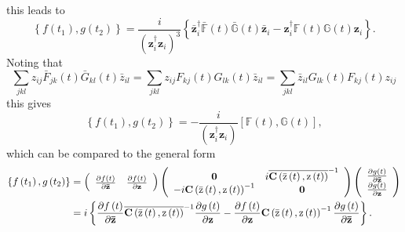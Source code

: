 \documentclass[aps,preprint]{revtex4}%
\begin{document}
this leads to
\begin{equation}
\left\{  f\left(  t_{1}\right)  ,g\left(  t_{2}\right)  \right\}  =\frac
{i}{\left(  \mathbf{z}_{i}^{\dagger}\mathbf{z}_{i}\right)  ^{3}}\left\{
\mathbf{\bar{z}}_{i}^{\dagger}\mathbb{\bar{F}}\left(  t\right)  \mathbb{\bar
{G}}\left(  t\right)  \mathbf{\bar{z}}_{i}-\mathbf{z}_{i}^{\dagger}%
\mathbb{F}\left(  t\right)  \mathbb{G}\left(  t\right)  \mathbf{z}%
_{i}\right\}  .
\end{equation}
Noting that
\begin{equation}
\sum_{jkl}z_{ij}\bar{F}_{jk}\left(  t\right)  \bar{G}_{kl}\left(  t\right)
\bar{z}_{il}=\sum_{jkl}z_{ij}F_{kj}\left(  t\right)  G_{lk}\left(  t\right)
\bar{z}_{il}=\sum_{jkl}\bar{z}_{il}G_{lk}\left(  t\right)  F_{kj}\left(
t\right)  z_{ij}%
\end{equation}
this gives
\begin{equation}
\left\{  f\left(  t_{1}\right)  ,g\left(  t_{2}\right)  \right\}  =-\frac
{i}{\left(  \mathbf{z}_{i}^{\dagger}\mathbf{z}_{i}\right)  }\left[
\mathbb{F}\left(  t\right)  ,\mathbb{G}\left(  t\right)  \right]  ,
\end{equation}
which can be compared to the general form%
\begin{align}
\left\{  f\left(  t_{1}\right)  ,g\left(  t_{2}\right)  \right\}    & =\left(
%
\begin{array}
[c]{cc}%
\frac{\partial f\left(  t\right)  }{\partial\mathbf{\bar{z}}} & \frac{\partial
f\left(  t\right)  }{\partial\mathbf{z}}%
\end{array}
\right)  \left(
\begin{array}
[c]{cc}%
\mathbf{0} & i\overline{\mathbf{C}\left(  \mathrm{\bar{z}}\left(  t\right)
\mathrm{,z}\left(  t\right)  \right)  }^{-1}\\
-i\mathbf{C}\left(  \mathrm{\bar{z}}\left(  t\right)  \mathrm{,z}\left(
t\right)  \right)  ^{-1} & \mathbf{0}%
\end{array}
\right)  \left(
\begin{array}
[c]{c}%
\frac{\partial g\left(  t\right)  }{\partial\mathbf{\bar{z}}}\\
\frac{\partial g\left(  t\right)  }{\partial\mathbf{z}}%
\end{array}
\right)  \nonumber\\
& =i\left\{  \frac{\partial f\left(  t\right)  }{\partial\mathbf{\bar{z}}%
}\overline{\mathbf{C}\left(  \mathrm{\bar{z}}\left(  t\right)  \mathrm{,z}%
\left(  t\right)  \right)  }^{-1}\frac{\partial g\left(  t\right)  }%
{\partial\mathbf{z}}-\frac{\partial f\left(  t\right)  }{\partial\mathbf{z}%
}\mathbf{C}\left(  \mathrm{\bar{z}}\left(  t\right)  \mathrm{,z}\left(
t\right)  \right)  ^{-1}\frac{\partial g\left(  t\right)  }{\partial
\mathbf{\bar{z}}}\right\}  .
\end{align}
\end{document}
